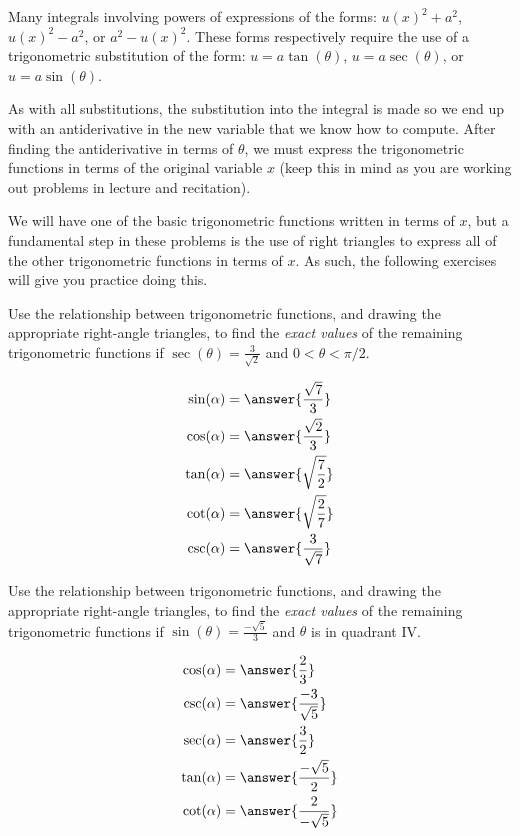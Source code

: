 \documentclass{ximera}
\begin{document}
\begin{problem}
  Many integrals involving powers of expressions of the forms: $u(x)^2 + a^2$, $u(x)^2 - a^2$, or $a^2 - u(x)^2$.
  These forms respectively require the use of a trigonometric substitution of the form: $u = a \tan(\theta)$, $u = a \sec(\theta)$, or $u = a \sin(\theta)$.
 
  As with all substitutions, the substitution into the integral is made so we end up with an antiderivative in the new variable that we know how to compute.
  After finding the antiderivative in terms of $\theta$, we must express the trigonometric functions in terms of the original variable $x$ (keep this in mind as you are working out problems in lecture and recitation). 
  
  We will have one of the basic trigonometric functions written in terms of $x$, but a fundamental step in these problems is the use of right triangles to express all of the other trigonometric functions in terms of $x$.
  As such, the following exercises will give you practice doing this.
  
  \begin{multipleChoice}
  \end{multipleChoice}  
\end{problem}

\begin{problem}
  Use the relationship between trigonometric functions, and drawing the appropriate right-angle triangles, to find the \emph{exact values} of the remaining trigonometric functions if $\sec(\theta) = \frac{3}{\sqrt{2}}$ and $0 < \theta < \pi/2$.
  
    \begin{align*}
      \sin(\alpha) &= \answer{\frac{\sqrt{7}}{3}}  \\
      \cos(\alpha) &= \answer{\frac{\sqrt{2}}{3}}  \\
      \tan(\alpha) &= \answer{\sqrt{\frac{7}{2}}}  \\
      \cot(\alpha) &= \answer{\sqrt{\frac{2}{7}}}  \\
      \csc(\alpha) &= \answer{\frac{3}{\sqrt{7}}}
    \end{align*}  
\end{problem}

\begin{problem}
   Use the relationship between trigonometric functions, and drawing the appropriate right-angle triangles, to find the \emph{exact values} of the remaining trigonometric functions if $\sin(\theta) = \frac{-\sqrt{5}}{3}$ and $\theta$ is in quadrant IV.
  
    \begin{align*}
      \cos(\alpha) &= \answer{\frac{2}{3}}  \\
      \csc(\alpha) &= \answer{\frac{-3}{\sqrt{5}}}  \\
      \sec(\alpha) &= \answer{\frac{3}{2}}  \\
      \tan(\alpha) &= \answer{\frac{-\sqrt{5}}{2}}  \\
      \cot(\alpha) &= \answer{\frac{2}{-\sqrt{5}}}
    \end{align*}  
\end{problem}
\end{document}
